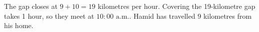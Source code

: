 The gap closes at $9+10=19$ kilometres per hour. Covering the 19-kilometre gap takes 1 hour, so they meet at $\boxed{10{:}00\text{ a.m.}}$. Hamid has travelled $\boxed9$ kilometres from his home.
